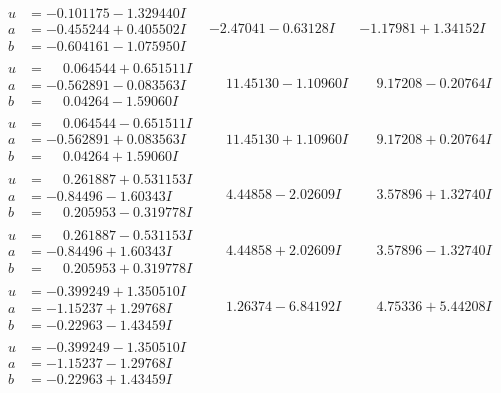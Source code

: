 \documentclass[1p]{elsarticle_modified}
\theoremstyle{definition}
\begin{document}
$$\begin{array}{c|c|c}
\begin{aligned}
u &= -0.101175 - 1.329440 I \\
a &= -0.455244 + 0.405502 I \\
b &= -0.604161 - 1.075950 I\end{aligned}
 & -2.47041 - 0.63128 I & -1.17981 + 1.34152 I \\ \hline\begin{aligned}
u &= \phantom{-}0.064544 + 0.651511 I \\
a &= -0.562891 - 0.083563 I \\
b &= \phantom{-}0.04264 - 1.59060 I\end{aligned}
 & \phantom{-}11.45130 - 1.10960 I & \phantom{-}9.17208 - 0.20764 I \\ \hline\begin{aligned}
u &= \phantom{-}0.064544 - 0.651511 I \\
a &= -0.562891 + 0.083563 I \\
b &= \phantom{-}0.04264 + 1.59060 I\end{aligned}
 & \phantom{-}11.45130 + 1.10960 I & \phantom{-}9.17208 + 0.20764 I \\ \hline\begin{aligned}
u &= \phantom{-}0.261887 + 0.531153 I \\
a &= -0.84496 - 1.60343 I \\
b &= \phantom{-}0.205953 - 0.319778 I\end{aligned}
 & \phantom{-}4.44858 - 2.02609 I & \phantom{-}3.57896 + 1.32740 I \\ \hline\begin{aligned}
u &= \phantom{-}0.261887 - 0.531153 I \\
a &= -0.84496 + 1.60343 I \\
b &= \phantom{-}0.205953 + 0.319778 I\end{aligned}
 & \phantom{-}4.44858 + 2.02609 I & \phantom{-}3.57896 - 1.32740 I \\ \hline\begin{aligned}
u &= -0.399249 + 1.350510 I \\
a &= -1.15237 + 1.29768 I \\
b &= -0.22963 - 1.43459 I\end{aligned}
 & \phantom{-}1.26374 - 6.84192 I & \phantom{-}4.75336 + 5.44208 I \\ \hline\begin{aligned}
u &= -0.399249 - 1.350510 I \\
a &= -1.15237 - 1.29768 I \\
b &= -0.22963 + 1.43459 I\end{aligned}

\end{array}$$
\end{document}
